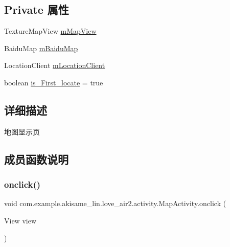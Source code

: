 \subsection*{Private 属性}
\begin{DoxyCompactItemize}
\item 
Texture\+Map\+View \mbox{\hyperlink{classcom_1_1example_1_1akisame__lin_1_1love__air2_1_1activity_1_1_map_activity_a64f6eb5b934ba13e913b0b04069463ce}{m\+Map\+View}}
\item 
Baidu\+Map \mbox{\hyperlink{classcom_1_1example_1_1akisame__lin_1_1love__air2_1_1activity_1_1_map_activity_acfa4dbc96c4bdc99205fd56a26e40d51}{m\+Baidu\+Map}}
\item 
Location\+Client \mbox{\hyperlink{classcom_1_1example_1_1akisame__lin_1_1love__air2_1_1activity_1_1_map_activity_a1deb2808e832c1c4995a93804defc8dc}{m\+Location\+Client}}
\item 
boolean \mbox{\hyperlink{classcom_1_1example_1_1akisame__lin_1_1love__air2_1_1activity_1_1_map_activity_a2389e2d3cbd6807f145c8ff2543afae2}{is\+\_\+\+First\+\_\+locate}} = true
\end{DoxyCompactItemize}


\subsection{详细描述}
地图显示页 

\subsection{成员函数说明}
\mbox{\label{classcom_1_1example_1_1akisame__lin_1_1love__air2_1_1activity_1_1_map_activity_acb33a3b734a4d5c579d45641b6eb4db0}} 
\subsubsection{\texorpdfstring{onclick()}{onclick()}}
{\footnotesize\ttfamily void com.\+example.\+akisame\+\_\+lin.\+love\+\_\+air2.\+activity.\+Map\+Activity.\+onclick (\begin{DoxyParamCaption}\item[{View}]{view }\end{DoxyParamCaption})\hspace{0.3cm}{\ttfamily [inline]}}

